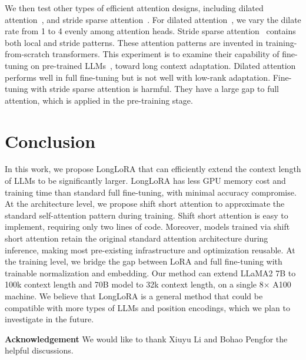 \documentclass{article} %
\begin{document}
We then test other types of efficient attention designs, including dilated attention~\citep{longnet},
and stride sparse attention~\citep{sparse-transformer}. For dilated attention~\citep{longnet}, we vary the dilate rate from 1 to 4 evenly among attention heads. %
Stride sparse attention~\citep{sparse-transformer} contains both local and stride patterns. %
These attention patterns are invented in training-from-scratch transformers. This experiment is to examine their capability of fine-tuning on pre-trained LLMs~\citep{llama2}, toward long context adaptation. Dilated attention performs well in full fine-tuning but is not well with low-rank adaptation. Fine-tuning with stride sparse attention is harmful. They have a large gap to full attention, which is applied in the pre-training stage.

\section{Conclusion}
\label{conclusion}
In this work, we propose LongLoRA that can efficiently extend the context length of LLMs to be significantly larger. LongLoRA has less GPU memory cost and training time than standard full fine-tuning, with minimal accuracy compromise. At the architecture level, we propose shift short attention to approximate the standard self-attention pattern during training. Shift short attention is easy to implement, requiring only two lines of code. Moreover, models trained via shift short attention retain the original standard attention architecture during inference, making most pre-existing infrastructure and optimization reusable. At the training level, we bridge the gap between LoRA and full fine-tuning with trainable normalization and embedding. Our method can extend LLaMA2 7B to 100k context length and 70B model to 32k context length, on a single 8$\times$ A100 machine.
We believe that LongLoRA is a general method that could be compatible with more types of LLMs and position encodings, which we plan to investigate in the future.

\textbf{Acknowledgement}
We would like to thank Xiuyu Li and Bohao Pengfor the helpful discussions.




\end{document}
